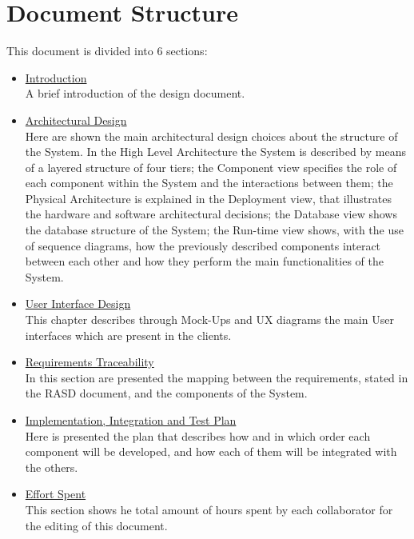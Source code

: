 \section{Document Structure}
This document is divided into 6 sections:

\begin{itemize}
\item \underline{Introduction} \\
A brief introduction of the design document.

\item \underline{Architectural Design} \\
Here are shown the main architectural design choices about the structure of the System. In the High Level Architecture the System is described by means of a layered structure of four tiers; the Component view specifies the role of each component within the System and the interactions between them; the Physical Architecture is explained in the Deployment view, that illustrates the hardware and software architectural decisions; the Database view shows the database structure of the System; the Run-time view shows, with the use of sequence diagrams, how the previously described components interact between each other and how they perform the main functionalities of the System.

\item \underline{User Interface Design} \\
This chapter describes through Mock-Ups and UX diagrams the main User interfaces which are present in the clients.

\item \underline{Requirements Traceability} \\
In this section are presented the mapping between the requirements, stated in the RASD document, and the components of the System.

\item \underline{Implementation, Integration and Test Plan} \\
Here is presented the plan that describes how and in which order each component will be developed, and how each of them will be integrated with the others.

\item \underline{Effort Spent} \\
This section shows he total amount of hours spent by each collaborator for the editing of this document.

\end{itemize}